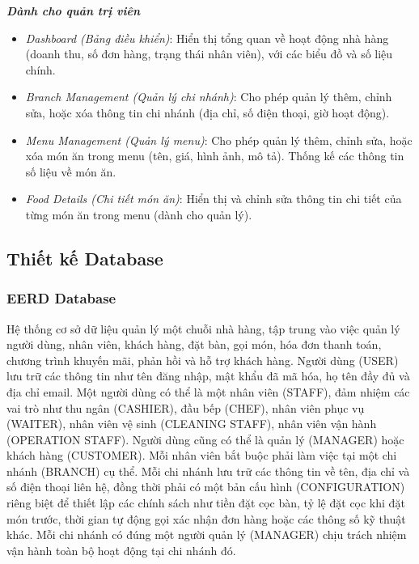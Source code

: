 \begin{enumerate}
	      \textit{\textbf{Dành cho quản trị viên}}
	      \begin{itemize}
		      \item \textit{Dashboard (Bảng điều khiển)}: Hiển thị tổng quan về hoạt động nhà hàng (doanh thu, số đơn hàng, trạng thái nhân viên), với các biểu đồ và số liệu chính.
		      \item \textit{Branch Management (Quản lý chi nhánh)}: Cho phép quản lý thêm, chỉnh sửa, hoặc xóa thông tin chi nhánh (địa chỉ, số điện thoại, giờ hoạt động).
		      \item \textit{Menu Management (Quản lý menu)}: Cho phép quản lý thêm, chỉnh sửa, hoặc xóa món ăn trong menu (tên, giá, hình ảnh, mô tả). Thống kế các thông tin số liệu về món ăn.
		      \item \textit{Food Details (Chi tiết món ăn)}: Hiển thị và chỉnh sửa thông tin chi tiết của từng món ăn trong menu (dành cho quản lý).
	      \end{itemize}

\end{enumerate}

\subsection{Thiết kế Database}
\subsubsection{EERD Database}

Hệ thống cơ sở dữ liệu quản lý một chuỗi nhà hàng, tập trung vào việc quản lý người dùng, nhân viên, khách hàng, đặt bàn, gọi món, hóa đơn thanh toán, chương trình khuyến mãi, phản hồi và hỗ trợ khách hàng. Người dùng (USER) lưu trữ các thông tin như tên đăng nhập, mật khẩu đã mã hóa, họ tên đầy đủ và địa chỉ email. Một người dùng có thể là một nhân viên (STAFF), đảm nhiệm các vai trò như thu ngân (CASHIER), đầu bếp (CHEF), nhân viên phục vụ (WAITER), nhân viên vệ sinh (CLEANING STAFF), nhân viên vận hành (OPERATION STAFF). Người dùng cũng có thể là quản lý (MANAGER) hoặc khách hàng (CUSTOMER). Mỗi nhân viên bắt buộc phải làm việc tại một chi nhánh (BRANCH) cụ thể. Mỗi chi nhánh lưu trữ các thông tin về tên, địa chỉ và số điện thoại liên hệ, đồng thời phải có một bản cấu hình (CONFIGURATION) riêng biệt để thiết lập các chính sách như tiền đặt cọc bàn, tỷ lệ đặt cọc khi đặt món trước, thời gian tự động gọi xác nhận đơn hàng hoặc các thông số kỹ thuật khác. Mỗi chi nhánh có đúng một người quản lý (MANAGER) chịu trách nhiệm vận hành toàn bộ hoạt động tại chi nhánh đó.

